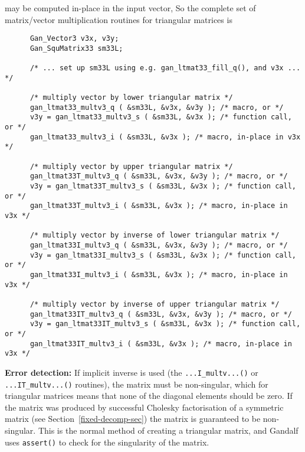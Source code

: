 may be computed in-place in the input vector, So the complete set of
matrix/vector multiplication routines for triangular matrices is
\begin{verbatim}
      Gan_Vector3 v3x, v3y;
      Gan_SquMatrix33 sm33L;

      /* ... set up sm33L using e.g. gan_ltmat33_fill_q(), and v3x ... */

      /* multiply vector by lower triangular matrix */
      gan_ltmat33_multv3_q ( &sm33L, &v3x, &v3y ); /* macro, or */
      v3y = gan_ltmat33_multv3_s ( &sm33L, &v3x ); /* function call, or */
      gan_ltmat33_multv3_i ( &sm33L, &v3x ); /* macro, in-place in v3x */

      /* multiply vector by upper triangular matrix */
      gan_ltmat33T_multv3_q ( &sm33L, &v3x, &v3y ); /* macro, or */
      v3y = gan_ltmat33T_multv3_s ( &sm33L, &v3x ); /* function call, or */
      gan_ltmat33T_multv3_i ( &sm33L, &v3x ); /* macro, in-place in v3x */

      /* multiply vector by inverse of lower triangular matrix */
      gan_ltmat33I_multv3_q ( &sm33L, &v3x, &v3y ); /* macro, or */
      v3y = gan_ltmat33I_multv3_s ( &sm33L, &v3x ); /* function call, or */
      gan_ltmat33I_multv3_i ( &sm33L, &v3x ); /* macro, in-place in v3x */

      /* multiply vector by inverse of upper triangular matrix */
      gan_ltmat33IT_multv3_q ( &sm33L, &v3x, &v3y ); /* macro, or */
      v3y = gan_ltmat33IT_multv3_s ( &sm33L, &v3x ); /* function call, or */
      gan_ltmat33IT_multv3_i ( &sm33L, &v3x ); /* macro, in-place in v3x */
\end{verbatim}

{\bf Error detection:} If implicit inverse is used (the {\tt ...I\_multv...()}
or {\tt ...IT\_multv...()} routines), the matrix must
be non-singular, which for triangular matrices means that none of the
diagonal elements should be zero. If the matrix was produced
by successful Cholesky factorisation of a symmetric matrix
(see Section~\ref{fixed-decomp-sec}) the matrix is guaranteed to be
non-singular. This is the normal method of creating a triangular matrix,
and Gandalf uses {\tt assert()} to check for the singularity of the matrix.

